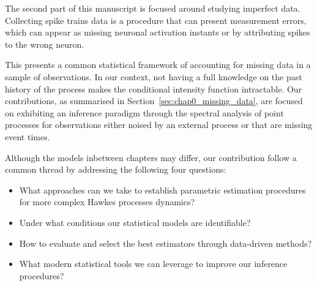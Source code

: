    The second part of this manuscript is focused around studying imperfect data.
    Collecting spike trains data is a procedure that can present measurement errors, which can appear as missing neuronal activation instants or by attributing spikes to the wrong neuron.

    This presents a common statistical framework of accounting for missing data in a sample of observations.
    In our context, not having a full knowledge on the past history of the process makes the conditional intensity function intractable.
    Our contributions, as summarised in Section~\ref{sec:chap0_missing_data}, are focused on exhibiting an inference paradigm through the spectral analysis of point processes for observations either noised by an external process or that are missing event times. 

    Although the models inbetween chapters may differ, our contribution follow a common thread by addressing the following four questions: 

    \begin{tcolorbox}
      \begin{itemize}
        \item What approaches can we take to establish parametric estimation procedures for more complex Hawkes processes dynamics?
        \item Under what conditions our statistical models are identifiable?
        \item How to evaluate and select the best estimators through data-driven methods?
        \item What modern statistical tools we can leverage to improve our inference procedures?
      \end{itemize}
    \end{tcolorbox}
    


